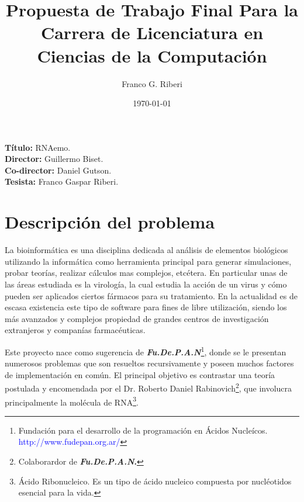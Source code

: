 \documentclass[12pt,a4paper]{article}
\begin{document}
 

\title{Propuesta de Trabajo Final Para la Carrera de Licenciatura en Ciencias de la Computación}
		\vskip 2cm
\author{Franco G. Riberi}
		\vskip 2cm
\date{\today} 	

\maketitle

\noindent \textbf{Título:} RNAemo. \\
\vskip 0.01cm
\noindent \textbf{Director:} Guillermo Biset.\\ %
\vskip 0.01cm
\noindent \textbf{Co-director:}  Daniel Gutson.\\
\vskip 0.01cm
\noindent \textbf{Tesista:} Franco Gaspar Riberi. \\


\section{Descripción del problema}

\par La bioinformática es una disciplina dedicada al análisis de elementos biológicos utilizando la
informática como herramienta principal para generar simulaciones, probar teorías,  realizar cálculos mas complejos, etcétera. En particular unas de las áreas estudiada es la virología, la cual estudia la acción de un virus y cómo pueden ser aplicados ciertos fármacos para su tratamiento. En la actualidad es de escasa existencia este tipo de software para fines de libre utilización, siendo los más avanzados y complejos propiedad de grandes centros de investigación extranjeros y companías farmacéuticas. 

\par Este proyecto nace como sugerencia de \textbf{\textit{Fu.De.P.A.N}}\footnote{Fundación para el desarrollo de la programación en Ácidos Nucleícos. \textcolor{blue}{http://www.fudepan.org.ar/}}, donde se le presentan numerosos problemas que son resueltos recursivamente y poseen muchos factores de implementación en común. El principal objetivo es contrastar una teoría postulada y encomendada por el Dr. Roberto Daniel Rabinovich\footnote{Colaborardor de \textbf{\textit{Fu.De.P.A.N}.}}, que involucra principalmente la molécula de RNA\footnote{Ácido Ribonucleico. Es un tipo de ácido nucleico compuesta por nucléotidos esencial para la vida.}.
\end{document}

